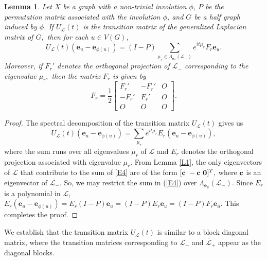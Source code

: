 \documentclass[12pt,a4paper]{article}
\newtheorem{lem}{Lemma}
\def \e {{\mathbf e}}
\def \o {{\bf 0}}
\def \c {{\bf c}}
\newcommand{\ob}[1]{\left(#1\right)}
\begin{document}
 \begin{lem}\label{L2}
Let $X$ be a graph with a non-trivial involution $\phi$, $P$ be the permutation matrix associated with the involution $\phi$, and $G$ be a half graph induced by $\phi$. If $U_\mathscr{L}(t)$ is the transition matrix of the generalized Laplacian matrix of $G,$ then for each $u \in V(G)$,
 \begin{equation}\label{E3}
 U_\mathscr{L}(t)\ob{\e_u-\e_{\phi(u)}}=(I-P)\sum_{\mu_r \in \Lambda_{\e_u}(\mathscr{L}_-)}e^{it\mu_r}F_r\e_u.
 \end{equation}
Moreover, if $F_r'$ denotes the orthogonal projection of $\mathscr{L}_-$ corresponding to the eigenvalue $\mu_r,$ then the matrix $F_r$ is given by
 $$F_r=\frac{1}{2}\begin{bmatrix}
 F_r'&-F_r'&O\\
 -F_r'& F_r'& O\\
 O& O & O
 \end{bmatrix}.$$
 \end{lem}
 \begin{proof}
The spectral decomposition of the transition matrix $U_\mathscr{L}(t)$ gives us
  \begin{equation}\label{E4}
  U_\mathscr{L}(t)\ob{\e_u-\e_{\phi(u)}}=\sum_{\mu_r}e^{it\mu_r}E_r\ob{\e_u-\e_{\phi(u)}},    
  \end{equation}
where the sum runs over all eigenvalues $\mu_r$ of $\mathscr{L}$ and $E_r$ denotes the orthogonal projection associated with eigenvalue $\mu_r$. From Lemma \ref{L1}, the only eigenvectors of $\mathscr{L}$ that contribute to the sum of \eqref{E4} are of the form $[\c~ -\c~ \o]^T,$ where $\c$ is an eigenvector of $\mathscr{L}_-.$ So, we may restrict the sum in (\ref{E4}) over $\Lambda_{\e_u}(\mathscr{L}_-)$. Since $E_r$ is a polynomial in $\mathscr{L},$  $E_r\ob{\e_u-\e_{\phi(u)}}=E_r(I-P)\e_u=(I-P)E_r\e_u=(I-P)F_r\e_u$. This completes the proof.
\end{proof}
We establish that the transition matrix $U_\mathscr{L}(t)$ is similar to a block diagonal matrix, where the transition matrices corresponding to  $\mathscr{L}_{-}$ and $\widetilde{\mathscr{L}_+}$ appear as the diagonal blocks.
\end{document}
